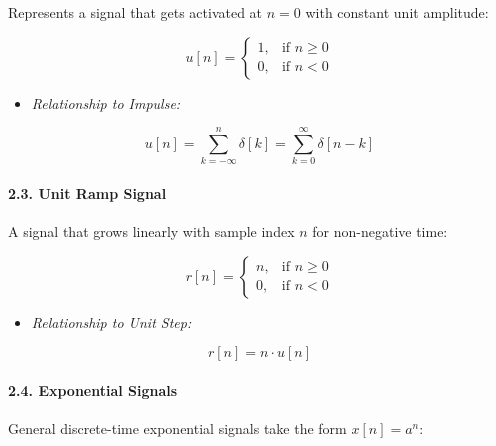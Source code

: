 Represents a signal that gets activated at \(n = 0\) with constant unit
amplitude:

\[  
u[n] = \begin{cases} 1, & \text{if } n \ge 0 \\ 0, & \text{if } n < 0 \end{cases}  
\]

\begin{itemize}
\tightlist
\item
  \emph{Relationship to Impulse:}
\end{itemize}

\[
u[n] = \sum_{k=-\infty}^{n} \delta[k] = \sum_{k=0}^{\infty} \delta[n-k]
\]

\paragraph{2.3. Unit Ramp Signal}\label{unit-ramp-signal}

A signal that grows linearly with sample index \(n\) for non-negative
time:

\[  
r[n] = \begin{cases} n, & \text{if } n \ge 0 \\ 0, & \text{if } n < 0 \end{cases}  
\]

\begin{itemize}
\tightlist
\item
  \emph{Relationship to Unit Step:}
\end{itemize}

\[
r[n] = n \cdot u[n]
\]

\paragraph{2.4. Exponential Signals}\label{exponential-signals}

General discrete-time exponential signals take the form \(x[n] = a^n\):

